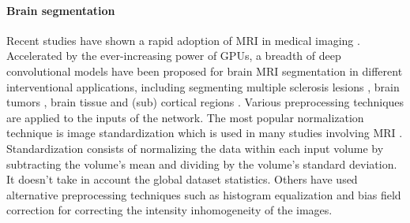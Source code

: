\documentclass[preprint,12pt]{elsarticle}
\begin{document}
\paragraph{Brain segmentation}
Recent studies have shown a rapid adoption of MRI in medical imaging \cite{Litjens2017}. Accelerated by the ever-increasing power of GPUs, a breadth of deep convolutional models have been proposed for brain MRI segmentation in different interventional applications, including segmenting multiple sclerosis lesions \cite{Kamnitsas2017}, brain tumors \cite{Kamnitsas2018, Zhao2018, Havaei2017}, brain tissue \cite{Dolz2019, Chen2018, Xue2007, Gui2012} and (sub) cortical regions \cite{dolz20183d,roy2019quicknat}. Various preprocessing techniques are applied to the inputs of the network. The most popular normalization technique is image standardization which is used in many studies involving MRI \cite{Birenbaum2016, Kamnitsas2017, Casamitjana2016, Chen2018}. Standardization consists of normalizing the data within each input volume by subtracting the volume’s mean and dividing by the volume’s standard deviation. It doesn’t take in account the global dataset statistics. Others have used alternative preprocessing techniques such as histogram equalization \cite{Onofrey2019} and bias field correction  \cite{Birenbaum2016, Baid2018, Feng2019} for correcting the intensity inhomogeneity of the images.
\end{document}
